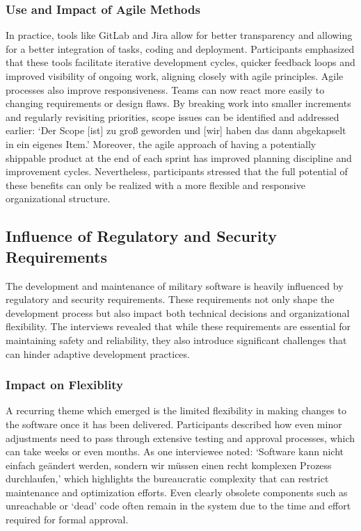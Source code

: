 \subsubsection{Use and Impact of Agile Methods}
In practice, tools like GitLab and Jira allow for better transparency and allowing for a better integration of tasks, coding and deployment. Participants emphasized that these tools facilitate iterative development cycles, quicker feedback loops and 
improved visibility of ongoing work, aligning closely with agile principles. 
Agile processes also improve responsiveness. Teams can now react more easily to changing requirements or design flaws. By breaking work into smaller increments and regularly revisiting priorities, scope issues can be identified and addressed earlier:
`Der Scope [ist] zu groß geworden und [wir] haben das dann abgekapselt in ein eigenes Item.' Moreover, the agile approach of having a potentially shippable product at the end of each sprint has improved planning discipline and improvement cycles.
Nevertheless, participants stressed that the full potential of these benefits can only be realized with a more flexible and responsive organizational structure.\\

\subsection{Influence of Regulatory and Security Requirements}
The development and maintenance of military software is heavily influenced by regulatory and security requirements. These requirements not only shape the development process but also impact both technical decisions and organizational flexibility.
The interviews revealed that while these requirements are essential for maintaining safety and reliability, they also introduce significant challenges that can hinder adaptive development practices.

\subsubsection{Impact on Flexiblity}
A recurring theme which emerged is the limited flexibility in making changes to the software once it has been delivered. Participants described how even minor adjustments need to pass through extensive testing and approval processes, which can take weeks or even months.
As one interviewee noted: `Software kann nicht einfach geändert werden, sondern wir müssen einen recht komplexen Prozess durchlaufen,' which highlights the bureaucratic complexity that can restrict maintenance and optimization efforts. Even clearly obsolete components such as unreachable or `dead' code
often remain in the system due to the time and effort required for formal approval.\\

